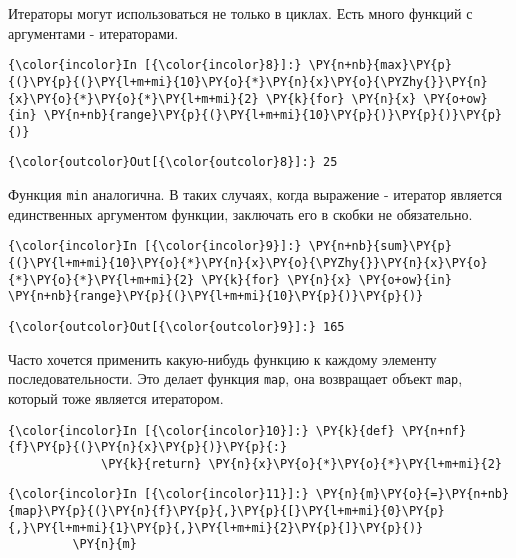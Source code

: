     Итераторы могут использоваться не только в циклах. Есть много функций с
аргументами - итераторами.

    \begin{Verbatim}[commandchars=\\\{\}]
{\color{incolor}In [{\color{incolor}8}]:} \PY{n+nb}{max}\PY{p}{(}\PY{p}{(}\PY{l+m+mi}{10}\PY{o}{*}\PY{n}{x}\PY{o}{\PYZhy{}}\PY{n}{x}\PY{o}{*}\PY{o}{*}\PY{l+m+mi}{2} \PY{k}{for} \PY{n}{x} \PY{o+ow}{in} \PY{n+nb}{range}\PY{p}{(}\PY{l+m+mi}{10}\PY{p}{)}\PY{p}{)}\PY{p}{)}
\end{Verbatim}


\begin{Verbatim}[commandchars=\\\{\}]
{\color{outcolor}Out[{\color{outcolor}8}]:} 25
\end{Verbatim}
            
    Функция \texttt{min} аналогична. В таких случаях, когда выражение -
итератор является единственных аргументом функции, заключать его в
скобки не обязательно.

    \begin{Verbatim}[commandchars=\\\{\}]
{\color{incolor}In [{\color{incolor}9}]:} \PY{n+nb}{sum}\PY{p}{(}\PY{l+m+mi}{10}\PY{o}{*}\PY{n}{x}\PY{o}{\PYZhy{}}\PY{n}{x}\PY{o}{*}\PY{o}{*}\PY{l+m+mi}{2} \PY{k}{for} \PY{n}{x} \PY{o+ow}{in} \PY{n+nb}{range}\PY{p}{(}\PY{l+m+mi}{10}\PY{p}{)}\PY{p}{)}
\end{Verbatim}


\begin{Verbatim}[commandchars=\\\{\}]
{\color{outcolor}Out[{\color{outcolor}9}]:} 165
\end{Verbatim}
            
    Часто хочется применить какую-нибудь функцию к каждому элементу
последовательности. Это делает функция \texttt{map}, она возвращает
объект \texttt{map}, который тоже является итератором.

    \begin{Verbatim}[commandchars=\\\{\}]
{\color{incolor}In [{\color{incolor}10}]:} \PY{k}{def} \PY{n+nf}{f}\PY{p}{(}\PY{n}{x}\PY{p}{)}\PY{p}{:}
             \PY{k}{return} \PY{n}{x}\PY{o}{*}\PY{o}{*}\PY{l+m+mi}{2}
\end{Verbatim}


    \begin{Verbatim}[commandchars=\\\{\}]
{\color{incolor}In [{\color{incolor}11}]:} \PY{n}{m}\PY{o}{=}\PY{n+nb}{map}\PY{p}{(}\PY{n}{f}\PY{p}{,}\PY{p}{[}\PY{l+m+mi}{0}\PY{p}{,}\PY{l+m+mi}{1}\PY{p}{,}\PY{l+m+mi}{2}\PY{p}{]}\PY{p}{)}
         \PY{n}{m}
\end{Verbatim}


